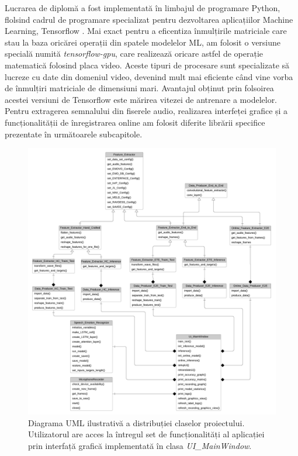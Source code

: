 \documentclass[a4paper,12pt]{book}
\begin{document}
				Lucrarea de diplomă a fost implementată în limbajul de programare Python, flolsind cadrul de programare specializat pentru dezvoltarea aplicațiilor Machine Learning, Tensorflow \cite{tensorflow}. Mai exact pentru a eficentiza înmulțirile matriciale care stau la baza oricărei operații din spatele modelelor ML, am folosit o versiune specială numită \textit{tensorflow-gpu}, care realizează oricare astfel de operație matematică folosind placa video. Aceste tipuri de procesare sunt specializate să lucreze cu date din domeniul video, devenind mult mai eficiente când vine vorba de înmulțiri matriciale de dimensiuni mari. Avantajul obținut prin folsoirea acestei versiuni de Tensorflow este mărirea  vitezei de antrenare a modelelor. Pentru extragerea semnalului din fiserele audio, realizarea interfeței grafice și a funcționalității de înregistrarea online am folosit diferite librării specifice prezentate în următoarele subcapitole. \par
				\begin{figure}[p]
					\hspace*{-1,5cm}
					\centering
					\includegraphics[scale=0.56]{uml}
					\caption{Diagrama UML ilustrativă a distribuției claselor proiectului. Utilizatorul are acces la întregul set de funcționalități al aplicației prin interfață grafică implementată în clasa \textit{UI\_MainWindow}.}
					\label{fig:uml}
				\end{figure} 
			
\end{document}
